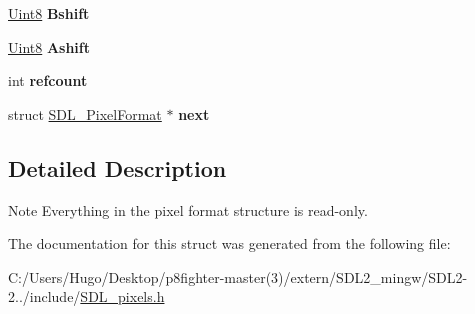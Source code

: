 \begin{DoxyCompactItemize}
\hyperlink{_s_d_l__stdinc_8h_a2944638813a090aa23e62f4da842c3e2}{Uint8} {\bfseries Bshift}
\item 
\mbox{\label{struct_s_d_l___pixel_format_ac3c4ffa0de1f2c94040340deede3bf46}} 
\hyperlink{_s_d_l__stdinc_8h_a2944638813a090aa23e62f4da842c3e2}{Uint8} {\bfseries Ashift}
\item 
\mbox{\label{struct_s_d_l___pixel_format_a23be8060443d58064a720a4e2ef31729}} 
int {\bfseries refcount}
\item 
\mbox{\label{struct_s_d_l___pixel_format_a1953b66c817116bf81bae4873ee6bce5}} 
struct \hyperlink{struct_s_d_l___pixel_format}{S\+D\+L\+\_\+\+Pixel\+Format} $\ast$ {\bfseries next}
\end{DoxyCompactItemize}


\subsection{Detailed Description}
\begin{DoxyNote}{Note}
Everything in the pixel format structure is read-\/only. 
\end{DoxyNote}


The documentation for this struct was generated from the following file\+:\begin{DoxyCompactItemize}
\item 
C\+:/\+Users/\+Hugo/\+Desktop/p8fighter-\/master(3)/extern/\+S\+D\+L2\+\_\+mingw/\+S\+D\+L2-\/2../include/\hyperlink{_s_d_l__pixels_8h}{S\+D\+L\+\_\+pixels.\+h}\end{DoxyCompactItemize}
